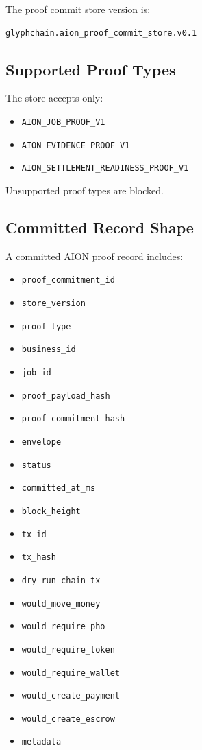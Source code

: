The proof commit store version is:

\begin{verbatim}
glyphchain.aion_proof_commit_store.v0.1
\end{verbatim}

\subsection{Supported Proof Types}

The store accepts only:

\begin{itemize}
  \item \texttt{AION\_JOB\_PROOF\_V1}
  \item \texttt{AION\_EVIDENCE\_PROOF\_V1}
  \item \texttt{AION\_SETTLEMENT\_READINESS\_PROOF\_V1}
\end{itemize}

Unsupported proof types are blocked.

\subsection{Committed Record Shape}

A committed AION proof record includes:

\begin{itemize}
  \item \texttt{proof\_commitment\_id}
  \item \texttt{store\_version}
  \item \texttt{proof\_type}
  \item \texttt{business\_id}
  \item \texttt{job\_id}
  \item \texttt{proof\_payload\_hash}
  \item \texttt{proof\_commitment\_hash}
  \item \texttt{envelope}
  \item \texttt{status}
  \item \texttt{committed\_at\_ms}
  \item \texttt{block\_height}
  \item \texttt{tx\_id}
  \item \texttt{tx\_hash}
  \item \texttt{dry\_run\_chain\_tx}
  \item \texttt{would\_move\_money}
  \item \texttt{would\_require\_pho}
  \item \texttt{would\_require\_token}
  \item \texttt{would\_require\_wallet}
  \item \texttt{would\_create\_payment}
  \item \texttt{would\_create\_escrow}
  \item \texttt{metadata}
\end{itemize}

